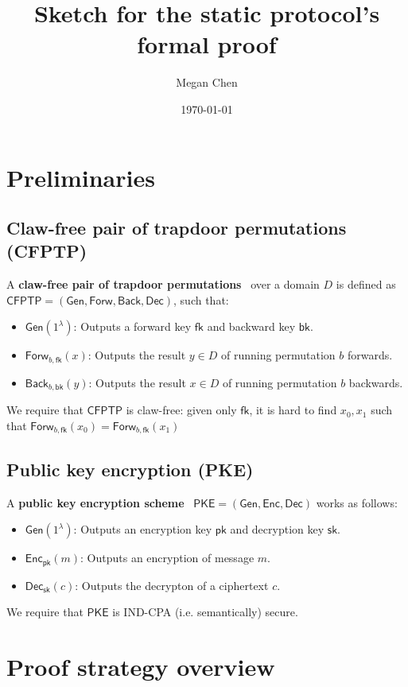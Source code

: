 \documentclass{article}[12pt]
\title{Sketch for the \cite{CanettiF01} static protocol's formal proof}
\author{Megan Chen}
\date{\today}
\renewcommand{\emph}[1]{\textbf{#1}~}
\newcommand{\SecParam}{\lambda}
\newcommand{\PKE}{\mathsf{PKE}}
\newcommand{\Gen}{\mathsf{Gen}}
\newcommand{\Enc}{\mathsf{Enc}}
\newcommand{\Dec}{\mathsf{Dec}}
\newcommand{\EncKey}{\mathsf{pk}}
\newcommand{\DecKey}{\mathsf{sk}}
\newcommand{\CFPTP}{\mathsf{CFPTP}}
\newcommand{\Forw}{\mathsf{Forw}}
\newcommand{\Back}{\mathsf{Back}}
\newcommand{\ForwKey}{\mathsf{fk}}
\newcommand{\BackKey}{\mathsf{bk}}
\newcommand{\Domain}{D}
\begin{document}
\maketitle
\tableofcontents

\section{Preliminaries}

\subsection{Claw-free pair of trapdoor permutations (CFPTP)}
A \emph{claw-free pair of trapdoor permutations} over a domain $\Domain$ is defined as $\CFPTP = (\Gen, \Forw, \Back, \Dec)$, such that:
\begin{itemize}
	\item $\Gen(1^\SecParam)$: Outputs a forward key $\ForwKey$ and backward key $\BackKey$.
	\item $\Forw_{b, \ForwKey}(x)$: Outputs the result $y\in \Domain$ of running permutation $b$ forwards.
	\item $\Back_{b, \BackKey}(y)$: Outputs the result $x\in \Domain$ of running permutation $b$ backwards.
\end{itemize}
We require that $\CFPTP$ is claw-free: given only $\ForwKey$, it is hard to find $x_0, x_1$ such that $\Forw_{b, \ForwKey}(x_0) = \Forw_{b, \ForwKey}(x_1)$


\subsection{Public key encryption (PKE)}

A \emph{public key encryption scheme} $\PKE = (\Gen, \Enc, \Dec)$ works as follows:
\begin{itemize}
	\item $\Gen(1^\SecParam)$: Outputs an encryption key $\EncKey$ and decryption key $\DecKey$.
	\item $\Enc_{\EncKey}(m)$: Outputs an encryption of message $m$.
	\item $\Dec_{\DecKey}(c)$: Outputs the decrypton of a ciphertext $c$.
\end{itemize}
We require that $\PKE$ is IND-CPA (i.e. semantically) secure.

\section{Proof strategy overview}
\end{document}
